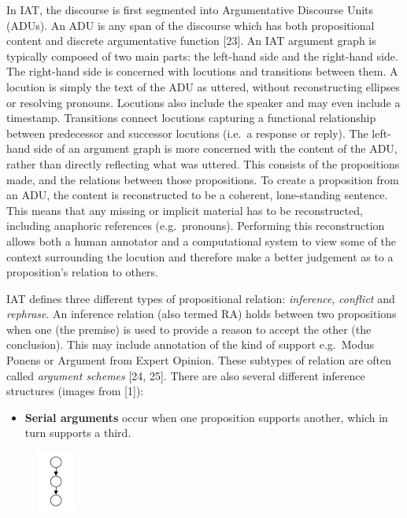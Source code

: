 \documentclass[twocolumn,twoside]{article}
\providecommand{\tightlist}{%
  \setlength{\itemsep}{0pt}\setlength{\parskip}{0pt}}
\begin{document}
In IAT, the discourse is first segmented into Argumentative Discourse
Units (ADUs). An ADU is any span of the discourse which has both
propositional content and discrete argumentative function {[}23{]}. An
IAT argument graph is typically composed of two main parts: the
left-hand side and the right-hand side. The right-hand side is concerned
with locutions and transitions between them. A locution is simply the
text of the ADU as uttered, without reconstructing ellipses or resolving
pronouns. Locutions also include the speaker and may even include a
timestamp. Transitions connect locutions capturing a functional
relationship between predecessor and successor locutions (i.e.~a
response or reply). The left-hand side of an argument graph is more
concerned with the content of the ADU, rather than directly reflecting
what was uttered. This consists of the propositions made, and the
relations between those propositions. To create a proposition from an
ADU, the content is reconstructed to be a coherent, lone-standing
sentence. This means that any missing or implicit material has to be
reconstructed, including anaphoric references (e.g.~pronouns).
Performing this reconstruction allows both a human annotator and a
computational system to view some of the context surrounding the
locution and therefore make a better judgement as to a proposition's
relation to others.

IAT defines three different types of propositional relation:
\emph{inference}, \emph{conflict} and \emph{rephrase}. An inference
relation (also termed RA) holds between two propositions when one (the
premise) is used to provide a reason to accept the other (the
conclusion). This may include annotation of the kind of support
e.g.~Modus Ponens or Argument from Expert Opinion. These subtypes of
relation are often called \emph{argument schemes} {[}24, 25{]}.
There are also several different inference structures (images from
{[}1{]}):

\begin{itemize}
\tightlist
\item
  \textbf{Serial arguments} occur when one proposition supports another,
  which in turn supports a third.
\end{itemize}

\begin{figure}[H]
    \centering
    \includegraphics[height=2cm]{serial}
\end{figure}
\end{document}
